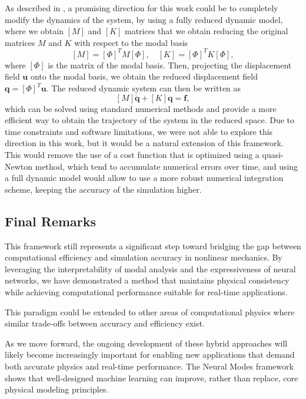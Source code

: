 \documentclass[11pt,a4paper]{article}
\numberwithin{equation}{section}
\begin{document}
As described in \cite{Andersson_2021}, a promising direction for this work could be to completely modify the dynamics of the system, by using a fully reduced dynamic model, where we obtain \(\left[M\right]\) and \(\left[K\right]\) matrices that we obtain reducing the original matrices \(M\) and \(K\) with respect to the modal basis
\begin{equation}
    \left[M\right] = \left[\Phi\right]^T M \left[\Phi\right], \quad \left[K\right] = \left[\Phi\right]^T K \left[\Phi\right],
\end{equation}
where \(\left[\Phi\right]\) is the matrix of the modal basis. Then, projecting the displacement field \(\mathbf{u}\) onto the modal basis, we obtain the reduced displacement field \(\mathbf{q} = \left[\Phi\right]^T \mathbf{u}\). The reduced dynamic system can then be written as
\begin{equation}
    \left[{M}\right] \ddot{\mathbf{q}} + \left[{K}\right] \mathbf{q} = \mathbf{f},
\end{equation}
which can be solved using standard numerical methods and provide a more efficient way to obtain the trajectory of the system in the reduced space. Due to time constraints and software limitations, we were not able to explore this direction in this work, but it would be a natural extension of this framework. This would remove the use of a cost function that is optimized using a quasi-Newton method, which tend to accumulate numerical errors over time, and using a full dynamic model would allow to use a more robust numerical integration scheme, keeping the accuracy of the simulation higher.


\subsection{Final Remarks}
This framework still represents a significant step toward bridging the gap between computational efficiency and simulation accuracy in nonlinear mechanics. By leveraging the interpretability of modal analysis and the expressiveness of neural networks, we have demonstrated a method that maintains physical consistency while achieving computational performance suitable for real-time applications.

This paradigm could be extended to other areas of computational physics where similar trade-offs between accuracy and efficiency exist.

As we move forward, the ongoing development of these hybrid approaches will likely become increasingly important for enabling new applications that demand both accurate physics and real-time performance. The Neural Modes framework shows that well-designed machine learning can improve, rather than replace, core physical modeling principles.
\newpage
\printbibliography
\end{document}
